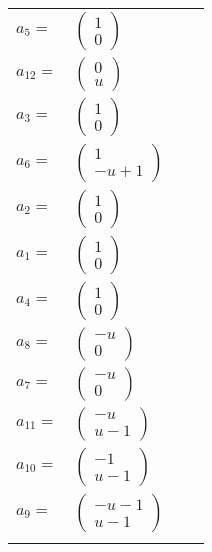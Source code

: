 \documentclass[1p]{elsarticle_modified}
\theoremstyle{definition}
\begin{document}
\begin{tabular}{m{7pt} m{180pt} m{7pt} m{180pt} }
\flushright $a_{5}=$&$\begin{pmatrix}1\\0\end{pmatrix}$ \\
\flushright $a_{12}=$&$\begin{pmatrix}0\\u\end{pmatrix}$ \\
\flushright $a_{3}=$&$\begin{pmatrix}1\\0\end{pmatrix}$ \\
\flushright $a_{6}=$&$\begin{pmatrix}1\\- u+1\end{pmatrix}$ \\
\flushright $a_{2}=$&$\begin{pmatrix}1\\0\end{pmatrix}$ \\
\flushright $a_{1}=$&$\begin{pmatrix}1\\0\end{pmatrix}$ \\
\flushright $a_{4}=$&$\begin{pmatrix}1\\0\end{pmatrix}$ \\
\flushright $a_{8}=$&$\begin{pmatrix}- u\\0\end{pmatrix}$ \\
\flushright $a_{7}=$&$\begin{pmatrix}- u\\0\end{pmatrix}$ \\
\flushright $a_{11}=$&$\begin{pmatrix}- u\\u-1\end{pmatrix}$ \\
\flushright $a_{10}=$&$\begin{pmatrix}-1\\u-1\end{pmatrix}$ \\
\flushright $a_{9}=$&$\begin{pmatrix}- u-1\\u-1\end{pmatrix}$\\&\end{tabular}
\end{document}
